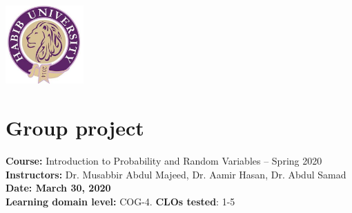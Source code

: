 \documentclass[a4paper, 11pt]{article}
\begin{document}
\setlength{\parskip}{10pt}
\setlength{\parindent}{0pt}
\begin{center}
	\large
	\includegraphics[width=3cm, height=3cm]{habib-Logo.jpeg}\\
	\section*{Group project}
	\textbf{Course:} Introduction to Probability and Random Variables -- Spring 2020\\
	\textbf{Instructors:} Dr. Musabbir Abdul Majeed, Dr. Aamir Hasan, Dr. Abdul Samad\\
	\textbf{Date: March 30, 2020}\\
	\textbf{Learning domain level:} COG-4. \textbf{CLOs tested}: 1-5\\

\end{center}
\end{document}
